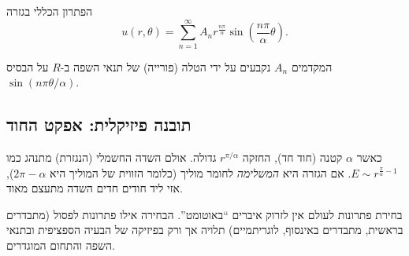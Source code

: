 \begin{resultbox}{הפתרון הכללי בגזרה}
\[
u(r,\theta)=
\sum_{n=1}^\infty
A_n
r^{\frac{n\pi}{\alpha}}
\sin\!\left(\frac{n\pi}{\alpha}\theta\right).
\]
\end{resultbox}

המקדמים \(A_n\) נקבעים על ידי הטלה (פורייה) של תנאי השפה ב-\(R\) על הבסיס \(\sin(n\pi\theta/\alpha)\).

\subsection{תובנה פיזיקלית: אפקט החוד}
כאשר \(\alpha\) קטנה (חוד חד), החזקה \(r^{\pi/\alpha}\) גדולה. אולם השדה החשמלי (הנגזרת) מתנהג כמו \(E \sim r^{\frac{\pi}{\alpha}-1}\). אם הגזרה היא \emph{המשלימה} לחומר מוליך (כלומר הזווית של המוליך היא \(2\pi-\alpha\)), אזי ליד חודים חדים השדה מתעצם מאוד.

\begin{warningbox}{בחירת פתרונות}
לעולם אין לזרוק איברים ``באוטומט''. הבחירה אילו פתרונות לפסול (מתבדרים בראשית, מתבדרים באינסוף, לוגריתמיים) תלויה אך ורק בפיזיקה של הבעיה הספציפית ובתנאי השפה והתחום המוגדרים.
\end{warningbox}
